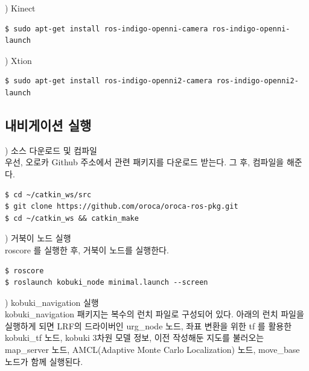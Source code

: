 \noindent
{}
\thenum) Kinect

\begin{lstlisting}[language=ROS]
$ sudo apt-get install ros-indigo-openni-camera ros-indigo-openni-launch
\end{lstlisting}

\noindent
{}
\thenum) Xtion

\begin{lstlisting}[language=ROS]
$ sudo apt-get install ros-indigo-openni2-camera ros-indigo-openni2-launch
\end{lstlisting}


\subsection{내비게이션 실행}

\setcounter{num}{0}

\vspace{\baselineskip}
\noindent
{}
\thenum) 소스 다운로드 및 컴파일\\
우선, 오로카 Github 주소에서 관련 패키지를 다운로드 받는다. 그 후, 컴파일을 해준다.

\vspace{\baselineskip}
\begin{lstlisting}[language=ROS]
$ cd ~/catkin_ws/src
$ git clone https://github.com/oroca/oroca-ros-pkg.git
$ cd ~/catkin_ws && catkin_make
\end{lstlisting}

\vspace{\baselineskip}
\noindent
{}
\thenum) 거북이 노드 실행\\
roscore 를 실행한 후, 거북이 노드를 실행한다.

\vspace{\baselineskip}
\begin{lstlisting}[language=ROS]
$ roscore
$ roslaunch kobuki_node minimal.launch --screen
\end{lstlisting}

\vspace{\baselineskip}
\noindent
{}
\thenum) kobuki\_navigation 실행\\
kobuki\_navigation 패키지는 복수의 런치 파일로 구성되어 있다. 아래의 런치 파일을 실행하게 되면 LRF의 드라이버인 urg\_node 노드, 좌표 변환을 위한 tf 를 활용한 kobuki\_tf 노드, kobuki 3차원 모델 정보, 이전 작성해둔 지도를 불러오는 map\_server 노드, AMCL(Adaptive Monte Carlo Localization) 노드, move\_base 노드가 함께 실행된다.

